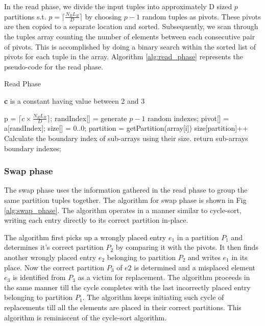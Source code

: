 In the read phase, we divide the input tuples into approximately D sized $p$ partitions s.t. $p = \lceil \frac{N_R L_R}{D} \rceil$ by choosing $p-1$ random tuples as pivots. These pivots are then copied to a separate location and sorted. Subsequently, we scan through the tuples array counting the number of elements between each consecutive pair of pivots. This is accomplished by doing a binary search within the sorted list of pivots for each tuple in the array. Algorithm \ref{alg:read_phase} represents the pseudo-code for the read phase.

\begin{algorithm}
\caption{Read Phase}
\label{alg:read_phase}
\textbf{c} is a constant having value between 2 and 3\\
\begin{algorithmic}[1]
\State p = $\lceil c\times \frac{N_R L_R}{D} \rceil$;
\State randIndex[] = generate $p-1$ random indexes;
\State pivot[] = a[randIndex];
\State size[] = {0..0};   
\State partition = getPartition(array[i]) 
\State size[partition]++ 
\EndFor
{}
\State Calculate the boundary index of sub-arrays using their size.
\State return sub-arrays boundary indexes;
\end{algorithmic}
\end{algorithm}


\subsubsection{Swap phase} 
The swap phase uses the information gathered in the read phase to group the same partition tuples together. The algorithm for swap phase is shown in Fig \ref{alg:swap_phase}. The algorithm operates in a manner similar to cycle-sort, writing each entry directly to its correct partition in-place. 

The algorithm first picks up a wrongly placed entry $e_1$ in a partition $P_1$ and determines it's correct partition $P_2$ by comparing it with the pivots. It then finds another wrongly placed entry $e_2$ belonging to partition $P_2$ and writes $e_1$ in its place. Now the correct partition $P_3$ of $e2$ is determined and a misplaced element $e_3$ is identified from $P_3$ as a victim for replacement. The algorithm proceeds in the same manner till the cycle completes with the last incorrectly placed entry belonging to partition $P_1$. The algorithm keeps initiating such cycle of replacements till all the elements are placed in their correct partitions. This algorithm is reminiscent of the cycle-sort algorithm.


